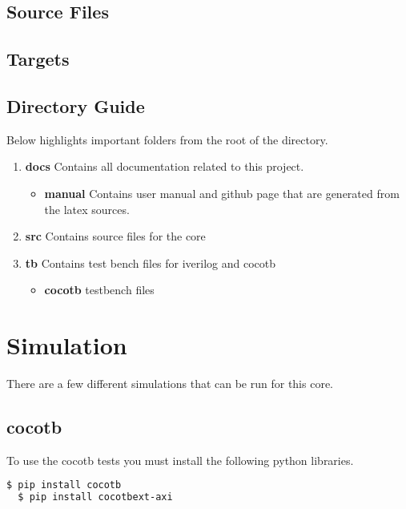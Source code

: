 \subsection{Source Files}



\subsection{Targets}



\subsection{Directory Guide}

\par
Below highlights important folders from the root of the directory.

\begin{enumerate}
  \item \textbf{docs} Contains all documentation related to this project.
    \begin{itemize}
      \item \textbf{manual} Contains user manual and github page that are generated from the latex sources.
    \end{itemize}
  \item \textbf{src} Contains source files for the core
  \item \textbf{tb} Contains test bench files for iverilog and cocotb
    \begin{itemize}
      \item \textbf{cocotb} testbench files
    \end{itemize}
\end{enumerate}

\newpage

\section{Simulation}
\par
There are a few different simulations that can be run for this core.

\subsection{cocotb}
\par
To use the cocotb tests you must install the following python libraries.
\begin{lstlisting}[language=bash]
  $ pip install cocotb
  $ pip install cocotbext-axi
\end{lstlisting}

